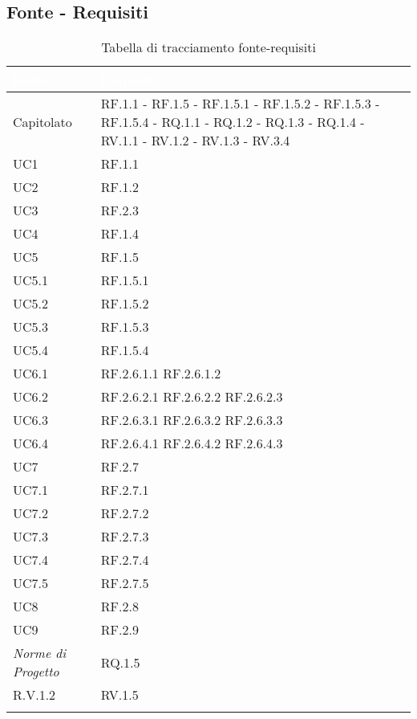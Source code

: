 \subsection{Fonte - Requisiti}
\begin{center}
  \centering
  \begin{longtable}{|C{6cm}|C{6cm}|}
    \hline
    \textcolor[HTML]{FFFFFF}{\textbf{Fonte}} & \textcolor[HTML]{FFFFFF}{\textbf{Requisiti}} \\ \hline
    Capitolato & RF.1.1 - RF.1.5 - RF.1.5.1 - RF.1.5.2 - RF.1.5.3 - RF.1.5.4 - RQ.1.1 - RQ.1.2 - RQ.1.3 - RQ.1.4 - RV.1.1 - RV.1.2 - RV.1.3 - RV.3.4 \\ \hline
    UC1 & RF.1.1 \\ \hline
    UC2 & RF.1.2 \\ \hline
    UC3 & RF.2.3 \\ \hline
    UC4 & RF.1.4 \\ \hline
    UC5 & RF.1.5 \\ \hline
    UC5.1 & RF.1.5.1 \\ \hline
    UC5.2 & RF.1.5.2 \\ \hline
    UC5.3 & RF.1.5.3 \\ \hline
    UC5.4 & RF.1.5.4 \\ \hline
    UC6.1 & RF.2.6.1.1 RF.2.6.1.2 \\ \hline
    UC6.2 & RF.2.6.2.1 RF.2.6.2.2 RF.2.6.2.3  \\ \hline
    UC6.3 & RF.2.6.3.1 RF.2.6.3.2 RF.2.6.3.3 \\ \hline
    UC6.4 & RF.2.6.4.1 RF.2.6.4.2 RF.2.6.4.3  \\ \hline
    UC7 & RF.2.7 \\ \hline
    UC7.1 & RF.2.7.1 \\ \hline
    UC7.2 & RF.2.7.2 \\ \hline
    UC7.3 & RF.2.7.3 \\ \hline
    UC7.4 & RF.2.7.4 \\ \hline
    UC7.5 & RF.2.7.5 \\ \hline
    UC8 & RF.2.8 \\ \hline
    UC9 & RF.2.9 \\ \hline
    \textit{Norme di Progetto} & RQ.1.5 \\ \hline
    R.V.1.2 & RV.1.5 \\ \hline

    \caption{Tabella di tracciamento fonte-requisiti}
  \end{longtable}
\end{center}

